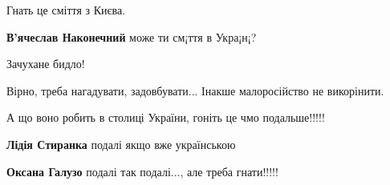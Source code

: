 \begin{itemize}
Гнать це сміття з Києва.

\begin{itemize}
 
\textbf{В'ячеслав Наконечний} може ти см¡ття в Укра¡н¡?
\end{itemize}

 
Зачухане бидло!

 
Вірно, треба нагадувати, задовбувати... Інакше малоросійство не викорінити.

 
А що воно робить в столиці України, гоніть це чмо подальше!!!!!

\begin{itemize}
 
\textbf{Лідія Стиранка} подалі якщо вже українською

 
\textbf{Оксана Галузо} подалі так подалі..., але треба гнати!!!!!


\end{itemize}
\end{itemize}
